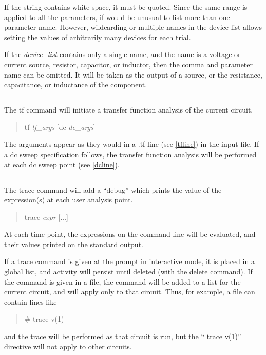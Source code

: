 If the string contains white space, it must be quoted.  Since the same
range is applied to all the parameters, if would be unusual to list
more than one parameter name.  However, wildcarding or multiple names
in the device list allows setting the values of arbitrarily many
devices for each trial.

If the {\it device\_list} contains only a single name, and the name is
a voltage or current source, resistor, capacitor, or inductor, then
the comma and parameter name can be omitted.  It will be taken as the
output of a source, or the resistance, capacitance, or inductance of
the component.

\subsection{}


The {\cb tf} command will initiate a transfer function analysis of the
current circuit.
\begin{quote}\vt
tf {\it tf\_args} [dc {\it dc\_args\/}]
\end{quote}
The arguments appear as they would in a {\vt .tf} line (see
\ref{tfline}) in the input file.  If a dc sweep specification follows,
the transfer function analysis will be performed at each dc sweep
point (see \ref{dcline}).

\subsection{}


The {\cb trace} command will add a ``debug'' which prints the value of
the expression(s) at each user analysis point.
\begin{quote}\vt
trace {\it expr\/} [...]
\end{quote}
At each time point, the expressions on the command line will be
evaluated, and their values printed on the standard output.

If a trace command is given at the prompt in interactive mode, it is
placed in a global list, and activity will persist until deleted (with
the {\cb delete} command).  If the command is given in a file, the
command will be added to a list for the current circuit, and will
apply only to that circuit.  Thus, for example, a {\WRspice} file can
contain lines like
\begin{quote}
{\vt *\# trace v(1)}
\end{quote}
and the trace will be performed as that circuit is run, but the ``{\vt
trace v(1)}'' directive will not apply to other circuits.

